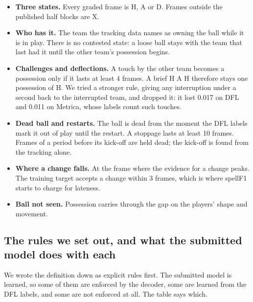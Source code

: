 \documentclass[10pt,a4paper]{article}
\begin{document}
\begin{itemize}\setlength{\itemsep}{2pt}

\item \textbf{Three states.} Every graded frame is H, A or D. Frames outside the published half blocks
  are X.

\item \textbf{Who has it.} The team the tracking data names as owning the ball while it is in play.
  There is no contested state: a loose ball stays with the team that last had it until the
  other team's possession begins.

\item \textbf{Challenges and deflections.} A touch by the other team becomes a possession only if it
  lasts at least 4 frames. A brief H A H therefore stays one possession of H. We tried a
  stronger rule, giving any interruption under a second back to the interrupted team, and
  dropped it: it lost 0.017 on DFL and 0.011 on Metrica, whose labels count such touches.

\item \textbf{Dead ball and restarts.} The ball is dead from the moment the DFL labels mark it out of
  play until the restart. A stoppage lasts at least 10 frames. Frames of a period before its
  kick-off are held dead; the kick-off is found from the tracking alone.

\item \textbf{Where a change falls.} At the frame where the evidence for a change peaks. The training
  target accepts a change within 3 frames, which is where spellF1 starts to charge for lateness.

\item \textbf{Ball not seen.} Possession carries through the gap on the players' shape and movement.

\end{itemize}


\subsection*{The rules we set out, and what the submitted model does with each}


We wrote the definition down as explicit rules first. The submitted model is learned, so some of
them are enforced by the decoder, some are learned from the DFL labels, and some are not enforced
at all. The table says which.
\end{document}

